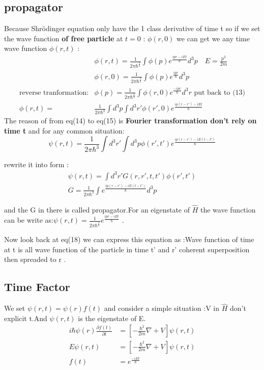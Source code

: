 \documentclass{article}
\begin{document}
  \subsection{propagator}

  Because Shr\"odinger equation only have the 1 class derivative of time t so if we set the wave function \textbf{of free particle} at $t=0$ : $\phi(r,0)$ we can get we any time wave function $\phi(r,t)$ :
  \begin{align}
   & \phi(r,t)=\frac1{{2\pi\hbar}^{\frac32}}\int \phi(p)e^{\frac{ipr-iEt}{\hbar}}d^3p\quad E=\frac{p^2}{2m} \\
& \phi(r,0)=\frac1{{2\pi\hbar}^{\frac32}}\int \phi(p)e^{\frac{ipr}{\hbar}}d^3p \\
    \text{reverse tranformation:}&\phi(p)=\frac1{{2\pi\hbar}^{\frac32}}\int \phi(r,0)e^{\frac{-ipr}{\hbar}}d^3r \text{ put back to (13)} \\
    \phi(r,t)=& \frac1{{2\pi\hbar}^{3}}\int d^3p\int d^3r'\phi(r',0)e^{\frac{ip(r-r')-iEt}{\hbar}}
  \end{align}
  The reason of from eq(14) to eq(15) is \textbf{Fourier transformation don't rely on time t}
  and for any common situation:
  \begin{equation}
    \psi(r,t)=\frac1{{2\pi\hbar}^3}\int d^3r'\int d^3p\phi(r',t')e^{\frac{ip(r-r')-iE(t-t')}{\hbar}}
  \end{equation}

  rewrite it into form :
  \begin{align}
   \psi(r,t)=\int d^3r' G(r,r',t,t') \phi(r',t') \\
   G=\frac1{{2\pi\hbar}^3}\int e^{\frac{ip(r-r')-iE(t-t')}{\hbar}}d^3p
  \end{align}

  and the G in there is called propagator.For an eigenstate of $\hat H$ the wave function can be write as:$\psi(r,t)=\frac1{{2\pi\hbar}^{\frac32}}e^{\frac{ipr-iEt}{\hbar}}$ .

  Now look back at eq(18) we can express this equation as :Wave function of time at t is  all wave function of the particle in time t' and r' coherent superposition then spreaded to r  .

  \subsection{Time Factor}

  We set $\psi(r,t)=\psi(r)f(t)$ and consider a simple situation :V in $\hat H$ don't explicit t.And $\psi(r,t)$ is the eigenstate of E.
\begin{align}
  i\hbar\psi(r)\frac{ \partial f(t)}{ \partial t}&=[-\frac{\hbar^2}{2m}\nabla+V]\psi(r,t) \\
  E\psi(r,t)&=[-\frac{ \hbar^2}{2m}\nabla+V]\psi(r,t) \\
  f(t)&=e^{\frac{-iEt}{\hbar}}
\end{align}
\end{document}

